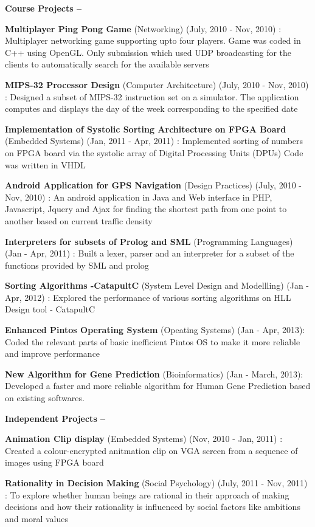 \documentclass[margin,line]{resume}
\begin{document}
\begin{resume}
    \textbf{Course Projects --}
    \begin{list2}
         \item \textbf{Multiplayer Ping Pong Game} (Networking) (July, 2010 - Nov, 2010) : Multiplayer networking game supporting
upto four players. Game was coded in C++ using OpenGL. Only submission which used UDP broadcasting for the clients to automatically search for the available servers
         \item \textbf{MIPS-32 Processor Design} (Computer Architecture) (July, 2010 - Nov, 2010) : Designed a subset of MIPS-32 instruction set on a simulator. The application computes and displays the day of the week corresponding to the
specified date
        \item \textbf{Implementation of Systolic Sorting Architecture on FPGA Board} (Embedded Systems) (Jan, 2011 - Apr,
2011) : Implemented sorting of numbers on FPGA board via the systolic array of Digital Processing Units (DPUs)
Code was written in VHDL
        \item \textbf{Android Application for GPS Navigation} (Design Practices) (July, 2010 - Nov, 2010) : An android application in Java and Web
interface in PHP, Javascript, Jquery and Ajax for finding the shortest path from one point to another based on
current traffic density
        \item \textbf{Interpreters for subsets of Prolog and SML} (Programming Languages) (Jan - Apr, 2011) : Built a
lexer, parser and an interpreter for a subset of the functions provided by SML and prolog
	\item \textbf{Sorting Algorithms -CatapultC} (System Level Design and Modellling) (Jan - Apr, 2012) : Explored the performance of various sorting algorithms on HLL Design tool - CatapultC 
	\item \textbf{Enhanced Pintos Operating System} (Opeating Systems) (Jan - Apr, 2013): Coded the relevant parts of basic inefficient Pintos OS to make it more reliable and improve performance
	\item \textbf{New Algorithm for Gene Prediction} (Bioinformatics)  (Jan - March, 2013): Developed a faster and more reliable algorithm for Human Gene Prediction based on existing softwares.
  \end{list2}

    \textbf{Independent Projects --}
    \begin{list2}	
	\item \textbf{Animation Clip display} (Embedded Systems) (Nov, 2010 - Jan, 2011) : Created a  colour-encrypted anitmation clip on VGA screen from a sequence of images using FPGA board
	\item \textbf{Rationality in Decision Making} (Social Psychology) (July, 2011 - Nov, 2011) : To explore whether human beings are rational in their approach of making decisions and how their rationality is influenced by social factors like ambitions and moral values
    \end{list2}		\vspace{2mm}
   

\end{resume}
\end{document}
